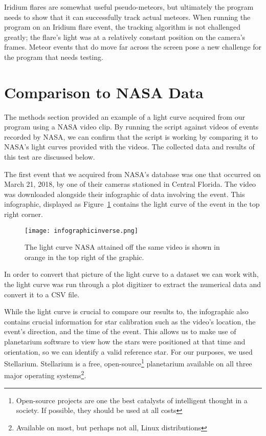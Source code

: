 Iridium flares are somewhat useful pseudo-meteors, but ultimately the program needs to show that it can successfully track actual meteors. When running the program on an Iridium flare event, the tracking algorithm is not challenged greatly; the flare's light was at a relatively constant position on the camera's frames. Meteor events that do move far across the screen pose a new challenge for the program that needs testing.

\section{Comparison to NASA Data}

The methods section provided an example of a light curve acquired from our program using a NASA video clip. By running the script against videos of events recorded by NASA, we can confirm that the script is working by comparing it to NASA's light curves provided with the videos. The collected data and results of this test are discussed below.

The first event that we acquired from NASA's database was one that occurred on March 21, 2018, by one of their cameras stationed in Central Florida. The video was downloaded alongside their infographic of data involving the event. This infographic, displayed as Figure~\ref{fig:infographic} contains the light curve of the event in the top right corner. 
\begin{figure}[ht!]
	\centering
	\texttt{[image: infographicinverse.png]}
	\caption{The light curve NASA attained off the same video is shown in orange in the top right of the graphic.}
	\label{fig:infographic}
\end{figure}
In order to convert that picture of the light curve to a dataset we can work with, the light curve was run through a plot digitizer to extract the numerical data and convert it to a CSV file.

While the light curve is crucial to compare our results to, the infographic also contains crucial information for star calibration such as the video's location, the event's direction, and the time of the event. This allows us to make use of planetarium software to view how the stars were positioned at that time and orientation, so we can identify a valid reference star. For our purposes, we used Stellarium. Stellarium is a free, open-source\footnote{Open-source projects are one the best catalysts of intelligent thought in a society. If possible, they should be used at all costs} planetarium available on all three major operating systems\footnote{Available on most, but perhaps not all, Linux distributions}.

